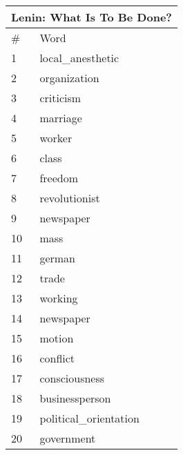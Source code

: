 
    \begin{center}
      \begin{tabular}{ | l | l | }
        \hline
        \multicolumn{2}{|c|}{Lenin: What Is To Be Done?} \\ \hline
        \# & Word  \\ \hline
1 & local_anesthetic \\ \hline 
2 & organization \\ \hline 
3 & criticism \\ \hline 
4 & marriage \\ \hline 
5 & worker \\ \hline 
6 & class \\ \hline 
7 & freedom \\ \hline 
8 & revolutionist \\ \hline 
9 & newspaper \\ \hline 
10 & mass \\ \hline 
11 & german \\ \hline 
12 & trade \\ \hline 
13 & working \\ \hline 
14 & newspaper \\ \hline 
15 & motion \\ \hline 
16 & conflict \\ \hline 
17 & consciousness \\ \hline 
18 & businessperson \\ \hline 
19 & political_orientation \\ \hline 
20 & government \\ \hline 

      \end{tabular}
    \end{center}
            